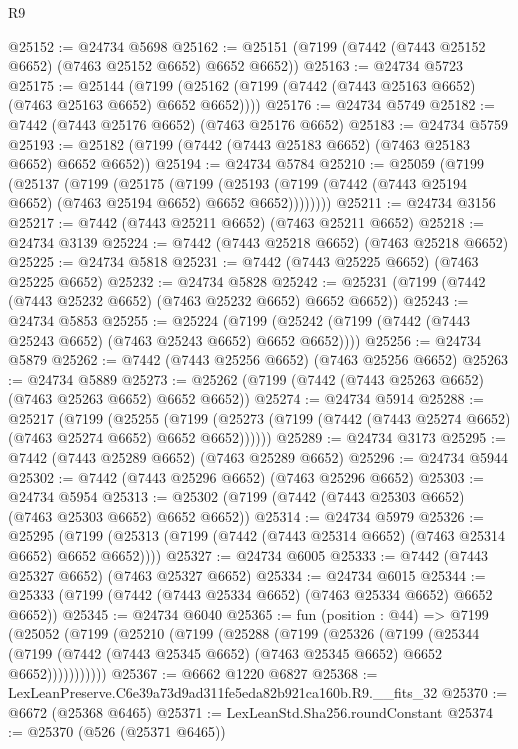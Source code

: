 \begin{lexlean}{R9}
\begin{coremodule}
@25152 := @24734 @5698
@25162 := @25151 (@7199 (@7442 (@7443 @25152 @6652) (@7463 @25152 @6652) @6652 @6652))
@25163 := @24734 @5723
@25175 := @25144
    (@7199 (@25162 (@7199 (@7442 (@7443 @25163 @6652) (@7463 @25163 @6652) @6652 @6652))))
@25176 := @24734 @5749
@25182 := @7442 (@7443 @25176 @6652) (@7463 @25176 @6652)
@25183 := @24734 @5759
@25193 := @25182 (@7199 (@7442 (@7443 @25183 @6652) (@7463 @25183 @6652) @6652 @6652))
@25194 := @24734 @5784
@25210 := @25059
    (@7199
      (@25137
        (@7199
          (@25175
            (@7199
              (@25193 (@7199 (@7442 (@7443 @25194 @6652) (@7463 @25194 @6652) @6652 @6652))))))))
@25211 := @24734 @3156
@25217 := @7442 (@7443 @25211 @6652) (@7463 @25211 @6652)
@25218 := @24734 @3139
@25224 := @7442 (@7443 @25218 @6652) (@7463 @25218 @6652)
@25225 := @24734 @5818
@25231 := @7442 (@7443 @25225 @6652) (@7463 @25225 @6652)
@25232 := @24734 @5828
@25242 := @25231 (@7199 (@7442 (@7443 @25232 @6652) (@7463 @25232 @6652) @6652 @6652))
@25243 := @24734 @5853
@25255 := @25224
    (@7199 (@25242 (@7199 (@7442 (@7443 @25243 @6652) (@7463 @25243 @6652) @6652 @6652))))
@25256 := @24734 @5879
@25262 := @7442 (@7443 @25256 @6652) (@7463 @25256 @6652)
@25263 := @24734 @5889
@25273 := @25262 (@7199 (@7442 (@7443 @25263 @6652) (@7463 @25263 @6652) @6652 @6652))
@25274 := @24734 @5914
@25288 := @25217
    (@7199
      (@25255
        (@7199 (@25273 (@7199 (@7442 (@7443 @25274 @6652) (@7463 @25274 @6652) @6652 @6652))))))
@25289 := @24734 @3173
@25295 := @7442 (@7443 @25289 @6652) (@7463 @25289 @6652)
@25296 := @24734 @5944
@25302 := @7442 (@7443 @25296 @6652) (@7463 @25296 @6652)
@25303 := @24734 @5954
@25313 := @25302 (@7199 (@7442 (@7443 @25303 @6652) (@7463 @25303 @6652) @6652 @6652))
@25314 := @24734 @5979
@25326 := @25295
    (@7199 (@25313 (@7199 (@7442 (@7443 @25314 @6652) (@7463 @25314 @6652) @6652 @6652))))
@25327 := @24734 @6005
@25333 := @7442 (@7443 @25327 @6652) (@7463 @25327 @6652)
@25334 := @24734 @6015
@25344 := @25333 (@7199 (@7442 (@7443 @25334 @6652) (@7463 @25334 @6652) @6652 @6652))
@25345 := @24734 @6040
@25365 := fun (position : @44) =>
  @7199
    (@25052
      (@7199
        (@25210
          (@7199
            (@25288
              (@7199
                (@25326
                  (@7199
                    (@25344
                      (@7199 (@7442 (@7443 @25345 @6652) (@7463 @25345 @6652) @6652 @6652)))))))))))
@25367 := @6662 @1220 @6827
@25368 := LexLeanPreserve.C6e39a73d9ad311fe5eda82b921ca160b.R9.__fits_32
@25370 := @6672 (@25368 @6465)
@25371 := LexLeanStd.Sha256.roundConstant
@25374 := @25370 (@526 (@25371 @6465))

\end{coremodule}
\end{lexlean}
